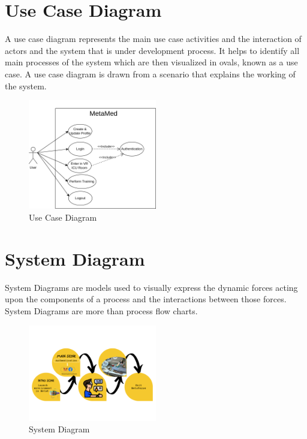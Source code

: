\section{Use Case Diagram}
A use case diagram represents the main use case activities and the interaction of actors and the system that is under development process. It helps to identify all main processes of the system which are then visualized in ovals, known as a use case. A use case diagram is drawn from a scenario that explains the working of the system.
\begin{figure}[h]
    \centering
    \includegraphics[width=0.5\textwidth, height=0.3\textheight]{Images/Use Case.drawio.png}
    \caption{Use Case Diagram}
    \label{fig:system-diagram}
\end{figure}


\section{System Diagram}
System Diagrams are models used to visually express the dynamic forces acting upon the components of a process and the interactions between those forces. System Diagrams are more than process flow charts.
\begin{figure}[h]
    \centering
    \includegraphics[width=0.5\textwidth, height=0.3\textheight]{Images/system.png}
    \caption{System Diagram}
    \label{fig:system-diagram}
\end{figure}





